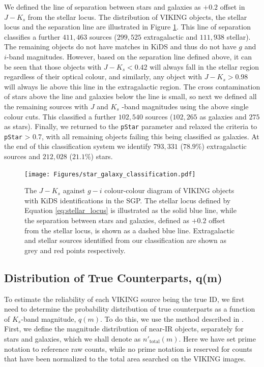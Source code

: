We defined the line of separation between stars and galaxies as $+0.2$ offset in $J - K_s$ from the stellar locus. The distribution of VIKING objects, the stellar locus and the separation line are illustrated in Figure \ref{fig:star_galaxy_classification}. This line of separation classifies a further $411,463$ sources ($299,525$ extragalactic and $111,938$ stellar). The remaining objects do not have matches in KiDS and thus do not have $g$ and $i$-band magnitudes. However, based on the separation line defined above, it can be seen that those objects with $J - K_s < 0.42$ will always fall in the stellar region regardless of their optical colour, and similarly, any object with  $J - K_s > 0.98$ will always lie above this line in the extragalactic region. The cross contamination of stars above the line and galaxies below the line is small, so next we defined all the remaining sources with $J$ and $K_s$ -band magnitudes using the above single colour cuts. This classified a further $102,540$ sources ($102,265$ as galaxies and $275$ as stars). Finally, we returned to the \texttt{pStar} parameter and relaxed the criteria to \texttt{pStar} > 0.7, with all remaining objects failing this being classified as galaxies. At the end of this classification system we identify $793,331$ ($78.9\%$) extragalactic sources and $212,028$ ($21.1\%$) stars.

\begin{figure}
    \centering
	\texttt{[image: Figures/star\_galaxy\_classification.pdf]}
	\caption[$J - K_s$ against $g-i$ colour-colour plot for VIKING objects in the SGP]{The $J - K_s$ against $g-i$ colour-colour diagram of VIKING objects with KiDS identifications in the SGP. The stellar locus defined by Equation \ref{eq:stellar_locus} is illustrated as the solid blue line, while the separation between stars and galaxies, defined as $+0.2$ offset from the stellar locus, is shown as a dashed blue line. Extragalactic and stellar sources identified from our classification are shown as grey and red points respectively.}
	\label{fig:star_galaxy_classification}
\end{figure}

\subsection{Distribution of True Counterparts, q(m)}
\label{sec:true_counterparts_distribution}

To estimate the reliability of each VIKING source being the true ID, we first need to determine the probability distribution of true counterparts as a function of $K_s$-band magnitude, $q(m)$. To do this, we use the method described in \citealt{Ciliegi_2003}. First, we define the magnitude distribution of near-IR objects, separately for stars and galaxies, which we shall denote as $n'_{\textrm{total}}(m)$. Here we have set prime notation to reference raw counts, while no prime notation is reserved for counts that have been normalized to the total area searched on the VIKING images. 

